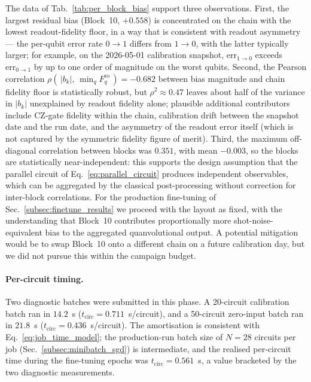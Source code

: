 The data of Tab.~\ref{tab:per_block_bias} support three observations. First, the largest residual bias (Block~10, $+0.558$) is concentrated on the chain with the lowest readout-fidelity floor, in a way that is consistent with readout asymmetry — the per-qubit error rate $0\!\to\!1$ differs from $1\!\to\!0$, with the latter typically larger; for example, on the 2026-05-01 calibration snapshot, $\mathrm{err}_{1\to0}$ exceeds $\mathrm{err}_{0\to1}$ by up to one order of magnitude on the worst qubits. Second, the Pearson correlation $\rho(\,|b_k|,\,\min_q F^{\mathrm{ro}}_q\,)=-0.682$ between bias magnitude and chain fidelity floor is statistically robust, but $\rho^2\!\approx\!0.47$ leaves about half of the variance in $|b_k|$ unexplained by readout fidelity alone; plausible additional contributors include CZ-gate fidelity within the chain, calibration drift between the snapshot date and the run date, and the asymmetry of the readout error itself (which is not captured by the symmetric fidelity figure of merit). Third, the maximum off-diagonal correlation between blocks was $0.351$, with mean $-0.003$, so the blocks are statistically near-independent: this supports the design assumption that the parallel circuit of Eq.~\ref{eq:parallel_circuit} produces independent observables, which can be aggregated by the classical post-processing without correction for inter-block correlations.
For the production fine-tuning of Sec.~\ref{subsec:finetune_results} we proceed with the layout as fixed, with the understanding that Block~10 contributes proportionally more shot-noise-equivalent bias to the aggregated quanvolutional output. A potential mitigation would be to swap Block~10 onto a different chain on a future calibration day, but we did not pursue this within the campaign budget.

\paragraph{Per-circuit timing.}
Two diagnostic batches were submitted in this phase. A 20-circuit calibration batch ran in $14.2$~s ($t_{\mathrm{circ}}=0.711$~s/circuit), and a 50-circuit zero-input batch ran in $21.8$~s ($t_{\mathrm{circ}}=0.436$~s/circuit). The amortisation is consistent with Eq.~\ref{eq:job_time_model}; the production-run batch size of $N=28$ circuits per job (Sec.~\ref{subsec:minibatch_sgd}) is intermediate, and the realised per-circuit time during the fine-tuning epochs was $t_{\mathrm{circ}}=0.561$~s, a value bracketed by the two diagnostic measurements.

